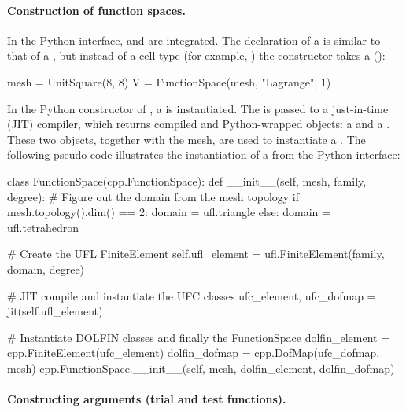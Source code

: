 \paragraph{Construction of function spaces.}
In the Python interface,  and
 are integrated. The declaration of a
 is similar to that of a ,
but instead of a cell type (for example, ) the
 constructor takes a  ():
\begin{python}
mesh = UnitSquare(8, 8)
V = FunctionSpace(mesh, "Lagrange", 1)
\end{python}
In the Python constructor of , a
 is instantiated. The 
is passed to a just-in-time (JIT) compiler, which returns compiled
and Python-wrapped  objects: a 
and a . These two objects, together with the mesh,
are used to instantiate a . The following pseudo
code illustrates the instantiation of a  from the
Python interface:
\begin{python}
class FunctionSpace(cpp.FunctionSpace):
    def __init__(self, mesh, family, degree):
        # Figure out the domain from the mesh topology
        if mesh.topology().dim() == 2:
            domain = ufl.triangle
        else:
            domain = ufl.tetrahedron

        # Create the UFL FiniteElement
        self.ufl_element = ufl.FiniteElement(family, domain, degree)

        # JIT compile and instantiate the UFC classes
        ufc_element, ufc_dofmap = jit(self.ufl_element)

        # Instantiate DOLFIN classes and finally the FunctionSpace
        dolfin_element = cpp.FiniteElement(ufc_element)
        dolfin_dofmap = cpp.DofMap(ufc_dofmap, mesh)
        cpp.FunctionSpace.__init__(self, mesh, dolfin_element, dolfin_dofmap)
\end{python}

\paragraph{Constructing arguments (trial and test functions).}

